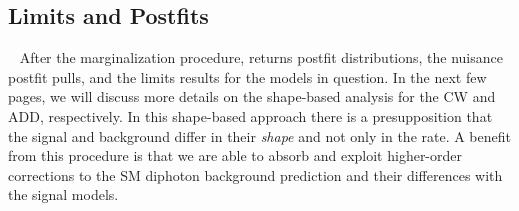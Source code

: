 



\subsection{Limits and Postfits}~\label{sec:postfitlimits}
After the marginalization procedure, \THETA returns postfit distributions, the nuisance postfit pulls, and the limits results for the models in question. In the next few pages, we will discuss more details on the shape-based analysis for the CW and ADD, respectively. In this shape-based approach there is a presupposition that the signal and background differ in their \emph{shape} and not only in the rate. A benefit from this procedure is that we are able to absorb and exploit higher-order corrections to the SM diphoton background prediction and their differences with the signal models.

